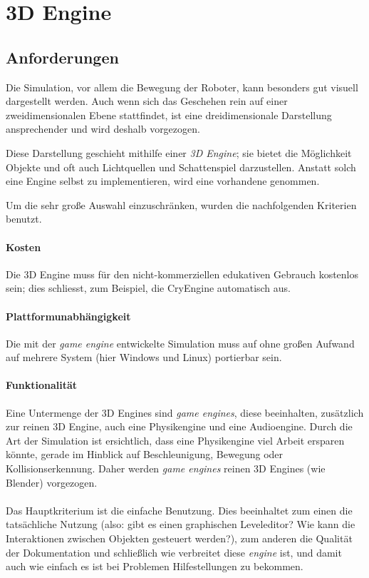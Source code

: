 \clearpage
\section{3D Engine}
\subsection{Anforderungen}
Die Simulation, vor allem die Bewegung der Roboter, kann besonders gut visuell dargestellt werden. Auch wenn sich das Geschehen rein auf einer zweidimensionalen Ebene stattfindet, ist eine dreidimensionale
Darstellung ansprechender und wird deshalb vorgezogen.

Diese Darstellung geschieht mithilfe einer \textit{3D Engine}; sie bietet die M{\"{o}}glichkeit Objekte und oft auch Lichtquellen und Schattenspiel darzustellen.
Anstatt solch eine Engine selbst zu implementieren, wird eine vorhandene genommen.

Um die sehr gro{\ss}e Auswahl einzuschr{\"{a}}nken, wurden die nachfolgenden Kriterien benutzt.

\paragraph{Kosten} Die 3D Engine muss f{\"{u}}r den nicht-kommerziellen edukativen Gebrauch kostenlos sein; dies schliesst, zum Beispiel, die CryEngine\cite{cryengine} automatisch aus.

\paragraph{Plattformunabh{\"{a}}ngigkeit} Die mit der \textit{game engine} entwickelte Simulation muss auf ohne gro{\ss}en Aufwand auf mehrere System (hier Windows und Linux) portierbar sein.

\paragraph{Funktionalit{\"{a}}t} Eine Untermenge der 3D Engines sind \textit{game engines}, diese beeinhalten, zus{\"{a}}tzlich zur reinen 3D Engine, auch eine Physikengine und eine Audioengine.
Durch die Art der Simulation ist ersichtlich, dass eine Physikengine viel Arbeit ersparen k{\"{o}}nnte, gerade im Hinblick auf Beschleunigung, Bewegung oder Kollisionserkennung. Daher werden \textit{game engines} reinen 3D Engines (wie Blender) vorgezogen.

\paragraph{} Das Hauptkriterium ist die einfache Benutzung. Dies beeinhaltet zum einen die
tats{\"{a}}chliche Nutzung (also: gibt es einen graphischen Leveleditor? Wie kann die Interaktionen zwischen
Objekten gesteuert werden?), zum anderen die Qualit{\"{a}}t der Dokumentation und schließlich wie verbreitet diese
\textit{engine} ist, und damit auch wie einfach es ist bei Problemen Hilfestellungen zu bekommen.

